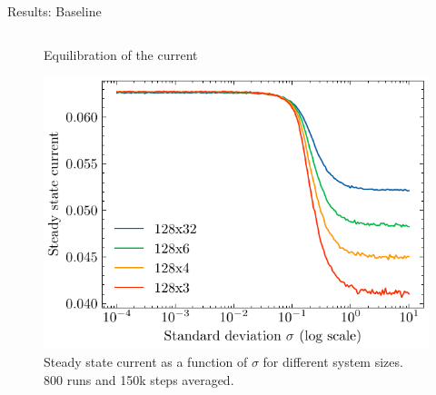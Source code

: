 \documentclass[10pt,xcolor=table, aspectratio=1610]{beamer}
\begin{document}
\begin{frame}{Results: Baseline}
\begin{columns}
\begin{overprint}
\begin{figure}
      \caption*{Equilibration of the current}
    \end{figure}
    \begin{figure}
      \includegraphics[width=\textwidth]{../Thesis/img/results/steady_state_current_sizes_log.pdf}
      \caption*{Steady state current as a function of $\sigma$ for different system sizes.\\800 runs and 150k steps averaged.}
    \end{figure}
    \end{overprint}
  \end{columns}
\end{frame}
\end{document}
